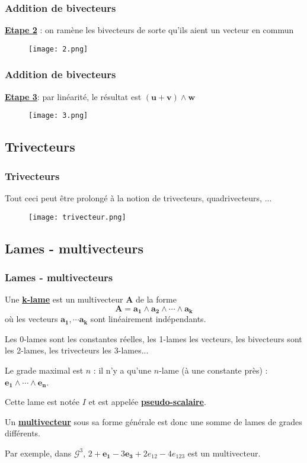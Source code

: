 \documentclass{beamer}
\newcommand{\sg}[1]{\textbf{\underline{#1}}}
\begin{document}
\begin{frame}
\frametitle{Addition de bivecteurs}
\begin{center}\sg{Etape 2}  : on ramène les bivecteurs de sorte qu'ils aient un vecteur en commun
\end{center} 
\begin{figure}[!ht]
\texttt{[image: 2.png]}
\end{figure}   
\end{frame}

\begin{frame}
\frametitle{Addition de bivecteurs}
\begin{center}
\sg{Etape 3}: par linéarité, le résultat est $(\bm{u}+\bm{v})\wedge\bm{w}$
\end{center}
\begin{figure}[!ht]
\texttt{[image: 3.png]}
\end{figure}   
\end{frame}

\subsection{Trivecteurs}
\begin{frame}
\frametitle{Trivecteurs}

Tout ceci peut être prolongé à la notion de trivecteurs, quadrivecteurs, ...
\begin{figure}[!ht]
\centering
\texttt{[image: trivecteur.png]}
\end{figure}   
\end{frame}

\subsection{Lames - multivecteurs}
\begin{frame}
\frametitle{Lames - multivecteurs}
Une \sg{k-lame} est un multivecteur $\bm{A}$ de la forme $$\bm{A} = \bm{a_1}  \wedge \bm{a_2} \wedge \cdots \wedge \bm{a_k}$$ où les vecteurs  $\bm{a_1}, \cdots \bm{a_k}$ sont linéairement indépendants. 
\pause

Les 0-lames sont les constantes réelles, les 1-lames les vecteurs, les bivecteurs sont les 2-lames, les trivecteurs les 3-lames... 
\pause

Le grade maximal est $n$ : il n'y a qu'une $n$-lame (à une constante près) : $\bm{e_1} \wedge \cdots \wedge \bm{e_n}$. 

Cette lame est notée $I$ et est appelée \sg{pseudo-scalaire}.
\pause

Un \sg{multivecteur} sous sa forme générale est donc une somme de lames de grades différents.

 Par exemple, dans $\mathscr{G}^3$, $2+ \bm{e_1}-3\bm{e_3}+2e_{12}-4e_{123}$ est un multivecteur.
\end{frame}
\end{document}
